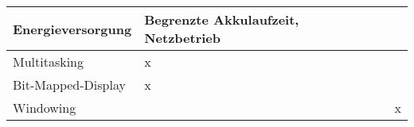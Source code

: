 \begin{table}[htb]
\begin{tabularx}{\linewidth}{%
|>{\raggedright\arraybackslash}X%
|>{\raggedright\arraybackslash}X%
|>{\raggedright\arraybackslash}X%
|>{\raggedright\arraybackslash}X%
|%
}
Energieversorgung      	& Begrenzte Akkulaufzeit, Netzbetrieb     		&                                   			&                            			\\ \hline
Multitasking           	& x                                       				&                                   			&                            			\\ \hline
Bit-Mapped-Display     	& x                                       				&                                   			&                            			\\ \hline
Windowing              	&                                         				&                                   			& x                          			\\ \hline
\end{tabularx}
\endgroup
\end{table}

